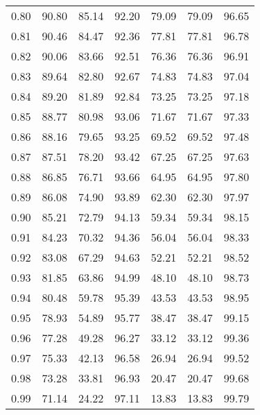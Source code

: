 \begin{tabular}{|c|c|c|c|c|c|c|}
      0.80 &     90.80 &     85.14 &      92.20 &   79.09 &      79.09 &         96.65 \\
      0.81 &     90.46 &     84.47 &      92.36 &   77.81 &      77.81 &         96.78 \\
      0.82 &     90.06 &     83.66 &      92.51 &   76.36 &      76.36 &         96.91 \\
      0.83 &     89.64 &     82.80 &      92.67 &   74.83 &      74.83 &         97.04 \\
      0.84 &     89.20 &     81.89 &      92.84 &   73.25 &      73.25 &         97.18 \\
      0.85 &     88.77 &     80.98 &      93.06 &   71.67 &      71.67 &         97.33 \\
      0.86 &     88.16 &     79.65 &      93.25 &   69.52 &      69.52 &         97.48 \\
      0.87 &     87.51 &     78.20 &      93.42 &   67.25 &      67.25 &         97.63 \\
      0.88 &     86.85 &     76.71 &      93.66 &   64.95 &      64.95 &         97.80 \\
      0.89 &     86.08 &     74.90 &      93.89 &   62.30 &      62.30 &         97.97 \\
      0.90 &     85.21 &     72.79 &      94.13 &   59.34 &      59.34 &         98.15 \\
      0.91 &     84.23 &     70.32 &      94.36 &   56.04 &      56.04 &         98.33 \\
      0.92 &     83.08 &     67.29 &      94.63 &   52.21 &      52.21 &         98.52 \\
      0.93 &     81.85 &     63.86 &      94.99 &   48.10 &      48.10 &         98.73 \\
      0.94 &     80.48 &     59.78 &      95.39 &   43.53 &      43.53 &         98.95 \\
      0.95 &     78.93 &     54.89 &      95.77 &   38.47 &      38.47 &         99.15 \\
      0.96 &     77.28 &     49.28 &      96.27 &   33.12 &      33.12 &         99.36 \\
      0.97 &     75.33 &     42.13 &      96.58 &   26.94 &      26.94 &         99.52 \\
      0.98 &     73.28 &     33.81 &      96.93 &   20.47 &      20.47 &         99.68 \\
      0.99 &     71.14 &     24.22 &      97.11 &   13.83 &      13.83 &         99.79 \\
\bottomrule
\end{tabular}
